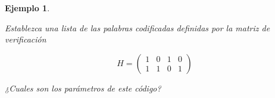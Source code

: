 \documentclass{beamer}
\theoremstyle{plain}
\theoremstyle{example}
\theoremstyle{example}
\newtheorem{ejemplo} [Ejemplo] {Ejemplo}
\begin{document}




\begin{frame}  \small  

\begin{ejemplo}\label{ej:CodeMatrizV}

Establezca  una lista de las palabras codificadas definidas por la matriz de verificación

\[
   H=      \left( \begin{array}{cccc}
                  1 & 0 & 1 & 0\\
                  1 & 1 & 0 & 1 	  
           			\end{array}
    		\right) 	    		
\]

¿Cuales son los parámetros de este código?\\
\end{ejemplo}
\end{frame} 
\end{document}
